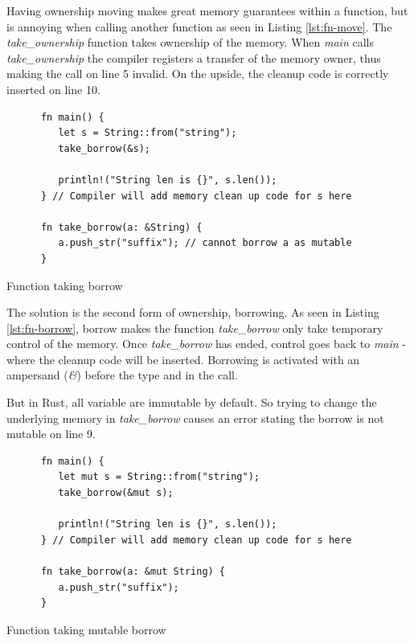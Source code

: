 \documentclass[a4paper,10pt]{article}
\begin{document}
Having ownership moving makes great memory guarantees within a function, but is annoying when calling another function as seen in Listing \ref{lst:fn-move}. The \textit{take\_ownership} function takes ownership of the memory. When \textit{main} calls \textit{take\_ownership} the compiler registers a transfer of the memory owner, thus making the call on line 5 invalid. On the upside, the cleanup code is correctly inserted on line 10.

\begin{listing}[ht]
   \begin{verbatim}
      fn main() {
         let s = String::from("string");
         take_borrow(&s);

         println!("String len is {}", s.len());
      } // Compiler will add memory clean up code for s here

      fn take_borrow(a: &String) {
         a.push_str("suffix"); // cannot borrow a as mutable
      }
   \end{verbatim}

   \caption{Function taking borrow}
   \label{lst:fn-borrow}
\end{listing}

The solution is the second form of ownership, borrowing. As seen in Listing \ref{lst:fn-borrow}, borrow makes the function \textit{take\_borrow} only take temporary control of the memory. Once \textit{take\_borrow} has ended, control goes back to \textit{main} - where the cleanup code will be inserted. Borrowing is activated with an ampersand (\textit{\&}) before the type and in the call.

But in Rust, all variable are immutable by default. So trying to change the underlying memory in \textit{take\_borrow} causes an error stating the borrow is not mutable on line 9.

\begin{listing}[ht]
   \begin{verbatim}
      fn main() {
         let mut s = String::from("string");
         take_borrow(&mut s);

         println!("String len is {}", s.len());
      } // Compiler will add memory clean up code for s here

      fn take_borrow(a: &mut String) {
         a.push_str("suffix");
      }
   \end{verbatim}

   \caption{Function taking mutable borrow}
   \label{lst:fn-mut-borrow}
\end{listing}
\end{document}
